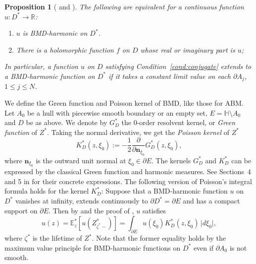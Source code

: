 \documentclass[preprint,12pt]{elsarticle}
\newtheorem{prop}[thm]{Proposition}
\theoremstyle{definition}
\newcommand{\R}{\mathbb{R}}
\newcommand{\mean}[3]{\mathbb{E}^{#1}_{#2}\left[ #3 \right]}
\newcommand{\uhp}{\mathbb{H}}
\begin{document}
\begin{prop}[{\cite{Ch12}} and {\cite[Section~3.3]{CFR16}}]
\label{prop:BMDharmonic}
The following are equivalent for a continuous function $u \colon D^* \to \R$:
\begin{enumerate}
\item \label{cond:BMDharmonic}
$u$ is BMD-harmonic on $D^*$.
\item \label{cond:conjugate}
There is a holomorphic function $f$ on $D$ whose real or imaginary part is $u$;
\end{enumerate}
In particular, a function $u$ on $D$ satisfying Condition~\eqref{cond:conjugate}
extends to a BMD-harmonic function on $D^*$
if it takes a constant limit value on each $\partial A_j$, $1 \leq j \leq N$.
\end{prop}

We define the Green function and Poisson kernel of BMD, like those for ABM.
Let $A_0$ be a hull with piecewise smooth boundary or an empty set,
$E=\uhp \setminus A_0$ and $D$ be as above.
We denote by $G^*_D$ the 0-order resolvent kernel,
or \emph{Green function} of $Z^*$.
Taking the normal derivative, we get the \emph{Poisson kernel} of $Z^*$
\[
K^*_D(z, \xi_0):= -\frac{1}{2}\frac{\partial}{\partial \mathbf{n}_{\xi_0}}G^*_D(z, \xi_0),
\]
where $\mathbf{n}_{\xi_0}$ is the outward unit normal at $\xi_0 \in \partial E$.
The kernels $G^*_D$ and $K^*_D$ can be expressed
by the classical Green function and harmonic measures.
See Sections~4 and 5 in \cite{CFR16} for their concrete expressions.
The following version of Poisson's integral formula holds for the kernel $K^*_D$:
Suppose that a BMD-harmonic function $u$ on $D^*$ vanishes at infinity,
extends continuously to $\partial D^*=\partial E$ and
has a compact support on $\partial E$.
Then by \cite[(5.5)]{CFR16} and the proof of \cite[Theorem~6.4]{CFR16},
$u$ satisfies
\begin{equation} \label{eq:Poi}
u(z)=\mean{*}{z}{u(Z^*_{\zeta^*-})}
=\int_{\partial E} u(\xi_0) K^*_D(z, \xi_0) \,\lvert d\xi_0 \rvert,
\end{equation}
where $\zeta^*$ is the lifetime of $Z^*$.
Note that the former equality holds by the maximum value principle
for BMD-harmonic functions on $D^*$
even if $\partial A_0$ is not smooth.
\end{document}
